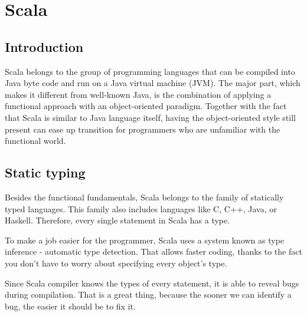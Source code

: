 \section{Scala}
\subsection{Introduction}
Scala belongs to the group of programming languages that can be compiled into Java byte code and run on a Java virtual machine (JVM). The major part, which makes it different from well-known Java, is the combination of applying a functional approach with an object-oriented paradigm. Together with the fact that Scala is similar to Java language itself, having the object-oriented style still present can ease up transition for programmers who are unfamiliar with the functional world.

\subsection{Static typing}

Besides the functional fundamentals, Scala belongs to the family of statically typed languages. This family also includes languages like C, C++, Java, or Haskell. Therefore, every single statement in Scala has a type.\cite{Scala static}

To make a job easier for the programmer, Scala uses a system known as type inference - automatic type detection. That allows faster coding, thanks to the fact you don’t have to worry about specifying every object’s type. 

Since Scala compiler knows the types of every statement, it is able to reveal bugs during compilation. That is a great thing, because the sooner we can identify a bug, the easier it should be to fix it. 
